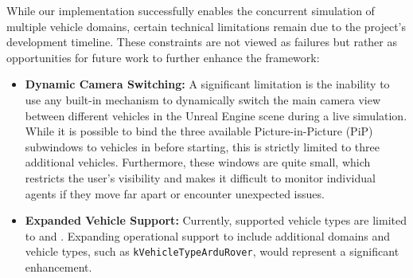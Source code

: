 While our implementation successfully enables the concurrent simulation of multiple vehicle domains, certain technical limitations remain due to the project's development timeline. These constraints are not viewed as failures but rather as opportunities for future work to further enhance the framework:
\begin{itemize}    
   \item \textbf{Dynamic Camera Switching:} A significant limitation is the inability to use any built-in mechanism to dynamically switch the main camera view between different vehicles in the Unreal Engine scene during a live simulation. While it is possible to bind the three available Picture-in-Picture (PiP) subwindows to vehicles in \texttt{} before starting, this is strictly limited to three additional vehicles. Furthermore, these windows are quite small, which restricts the user's visibility and makes it difficult to monitor individual agents if they move far apart or encounter unexpected issues.
    
    \item \textbf{Expanded Vehicle Support:} Currently, supported vehicle types are limited to \texttt{} and \texttt{}. Expanding operational support to include additional domains and vehicle types, such as \texttt{kVehicleTypeArduRover}, would represent a significant enhancement.
\end{itemize}